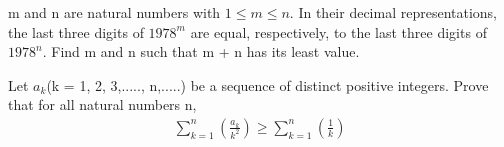 \item m and n are natural numbers with $1 \leq m \leq n.$ In their decimal representations, the last three digits of $1978^{m}$ are equal, respectively, to the last three digits of $1978^{n}.$ Find m and n such that m + n has its least value.

\item Let $a_{k}$(k = 1, 2, 3,....., n,.....) be a sequence of distinct positive integers. Prove that for all natural numbers n,
\begin{align*}
\sum_{k=1}^{n}(\frac{a_k}{k^2}) \geq \sum_{k=1}^{n}(\frac{1}{k})
\end{align*}


